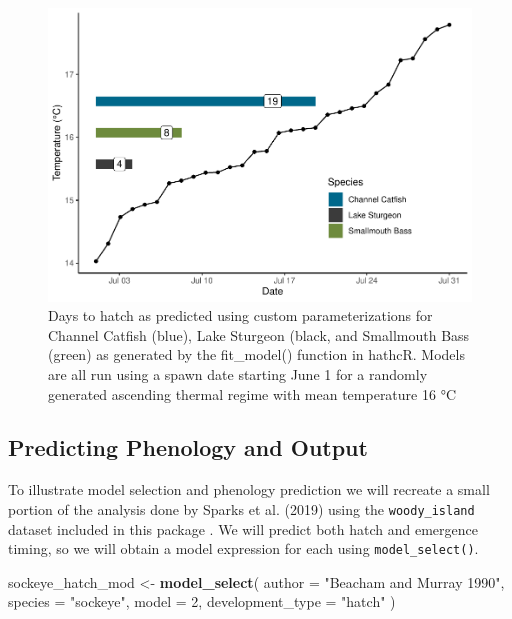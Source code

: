 \documentclass[10pt,a4paper,onecolumn]{article}
\newenvironment{Shaded}{\begin{snugshade}}{\end{snugshade}}
\newcommand{\AttributeTok}[1]{\textcolor[rgb]{0.13,0.29,0.53}{#1}}
\newcommand{\DecValTok}[1]{\textcolor[rgb]{0.00,0.00,0.81}{#1}}
\newcommand{\FunctionTok}[1]{\textcolor[rgb]{0.13,0.29,0.53}{\textbf{#1}}}
\newcommand{\NormalTok}[1]{#1}
\newcommand{\OtherTok}[1]{\textcolor[rgb]{0.56,0.35,0.01}{#1}}
\newcommand{\StringTok}[1]{\textcolor[rgb]{0.31,0.60,0.02}{#1}}
\begin{document}
\begin{figure}
\centering
\includegraphics{paper_files/figure-latex/unnamed-chunk-10-1.pdf}
\caption{Days to hatch as predicted using custom parameterizations for
Channel Catfish (blue), Lake Sturgeon (black, and Smallmouth Bass
(green) as generated by the fit\_model() function in hathcR. Models are
all run using a spawn date starting June 1 for a randomly generated
ascending thermal regime with mean temperature 16 °C}
\end{figure}

\subsection{Predicting Phenology and
Output}\label{predicting-phenology-and-output}

To illustrate model selection and phenology prediction we will recreate
a small portion of the analysis done by Sparks et al. (2019) using the
\texttt{woody\_island} dataset included in this package . We will
predict both hatch and emergence timing, so we will obtain a model
expression for each using \texttt{model\_select()}.

\begin{Shaded}
\begin{Highlighting}[]
\NormalTok{sockeye\_hatch\_mod }\OtherTok{\textless{}{-}} \FunctionTok{model\_select}\NormalTok{(}
  \AttributeTok{author =} \StringTok{"Beacham and Murray 1990"}\NormalTok{, }
  \AttributeTok{species =} \StringTok{"sockeye"}\NormalTok{, }
  \AttributeTok{model =} \DecValTok{2}\NormalTok{, }
  \AttributeTok{development\_type =} \StringTok{"hatch"}
\NormalTok{  )}
\end{Highlighting}
\end{Shaded}
\end{document}
